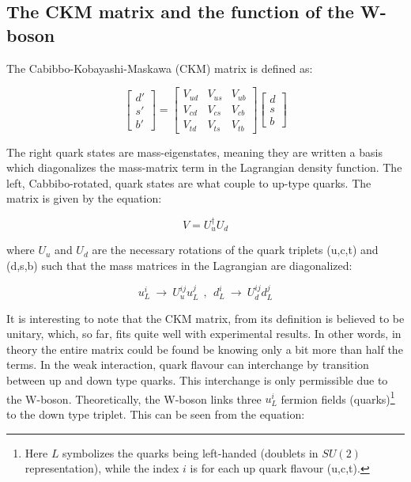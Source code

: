 \documentclass[11pt,a4paper]{article}
\begin{document}
\subsection{The CKM matrix and the function of the W-boson}
The Cabibbo-Kobayashi-Maskawa (CKM) matrix is defined as:


\begin{equation}
\begin{bmatrix}
d' \\ s' \\ b'
\end{bmatrix} =
\begin{bmatrix}
V_{ud} & V_{us} & V_{ub} \\
V_{cd} & V_{cs} & V_{cb} \\
V_{td} & V_{ts} & V_{tb}
\end{bmatrix}
\begin{bmatrix}
d \\ s \\ b
\end{bmatrix}
\label{CKM_matrix}
\end{equation}

The right quark states are mass-eigenstates, meaning they are written a basis which diagonalizes the mass-matrix term in the Lagrangian density function. The left, Cabbibo-rotated, quark states are what couple to up-type quarks. The matrix is given by the equation:

\begin{equation}
V = U_u^\dagger U_d
\end{equation}

where $U_u$ and $U_d$ are the necessary rotations of the quark triplets (u,c,t) and (d,s,b) such that the mass matrices in the Lagrangian are diagonalized:

\begin{equation}
u_L^i \:\rightarrow\: U_u^{ij} u_L^j \:\:,\:\:
d_L^i \:\rightarrow\: U_d^{ij} d_L^j
\end{equation}

It is interesting to note that the CKM matrix, from its definition is believed to be unitary, which, so far, fits quite well with experimental results. In other words, in theory the entire matrix could be found be knowing only a bit more than half the terms. In the weak interaction, quark flavour can interchange by transition between up and down type quarks. This interchange is only permissible due to the W-boson. Theoretically, the W-boson links three $u_L^i$ fermion fields (quarks)\footnote{Here $L$ symbolizes the quarks being left-handed (doublets in $SU(2)$ representation), while the index $i$ is for each up quark flavour (u,c,t).} to the down type triplet. This can be seen from the equation:
\end{document}
